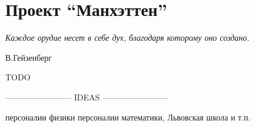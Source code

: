 \chapter{Проект ``Манхэттен''}

\epigraph{\emph{Каждое орудие несет в себе дух, \break благодаря которому оно создано.}}{В.Гейзенберг}

TODO

------------------------ IDEAS ------------------------ 

персоналии физики
персоналии математики, Львовская школа и т.п.
